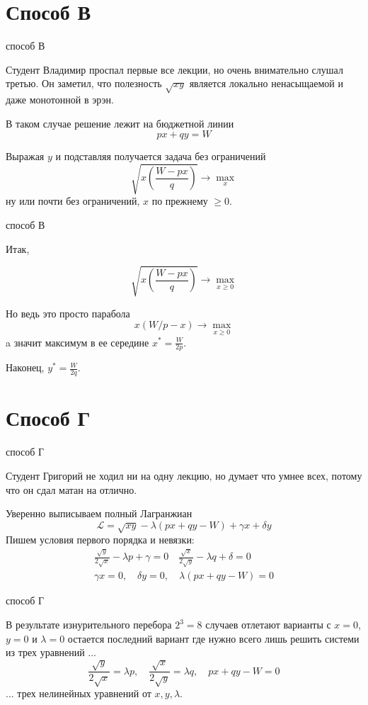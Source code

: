 \documentclass{beamer}
\begin{document}
\section{Способ В}

\begin{frame}{способ В}

Студент Владимир проспал первые все лекции, но очень внимательно слушал третью. Он заметил, что полезность $\sqrt{xy}$ является локально ненасыщаемой и даже монотонной в эрэн. 

В таком случае решение лежит на бюджетной линии
$$ px + qy = W$$

Выражая $y$ и подставляя получается задача без ограничений
$$ \sqrt{x (\frac{W - px}{q})} \to \max_{x}$$
ну или почти без ограничений, $x$ по прежнему $\geqslant 0$.
\end{frame}

\begin{frame}{способ В}

Итак,

$$ \sqrt{x (\frac{W - px}{q})} \to \max_{x \geqslant 0}$$

Но ведь это просто парабола $$x (W/p - x) \to \max_{x \geqslant 0} $$
a значит максимум в ее середине $x^* = \frac{W}{2p}$. 

Наконец, $y^* = \frac{W}{2q}$.

\end{frame}

\section{Способ Г}

\begin{frame}{способ Г}

Студент Григорий не ходил ни на одну лекцию, но думает что умнее всех, потому что он сдал матан на отлично.

Уверенно выписываем полный Лагранжиан
$$ \mathcal{L} = \sqrt{xy} - \lambda (px + qy - W) + \gamma x + \delta y$$
Пишем условия первого порядка и невязки:
\begin{gather}
	\frac{\sqrt{y}}{2 \sqrt{x}} - \lambda p + \gamma = 0 \quad \frac{\sqrt{x}}{2 \sqrt{y}} - \lambda q + \delta = 0\\
	\gamma x = 0, \quad \delta y = 0, \quad \lambda (px + qy - W) = 0
\end{gather}

\end{frame}

\begin{frame}{способ Г}

В результате изнурительного перебора $2^3 = 8$ случаев отлетают варианты с $x = 0$, $y = 0$ и $\lambda = 0$ остается последний вариант где нужно всего лишь решить системи из трех уравнений ...
$$ \frac{\sqrt{y}}{2 \sqrt{x}} = \lambda p, \quad \frac{\sqrt{x}}{2 \sqrt{y}} = \lambda q, \quad  px + qy - W = 0$$
... трех нелинейных уравнений от $x,y,\lambda$.
\end{frame}
\end{document}
